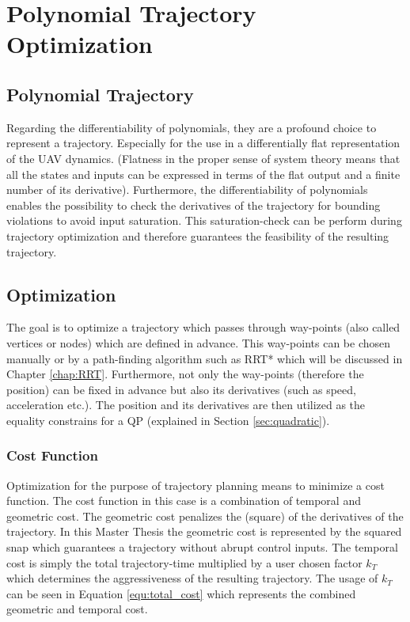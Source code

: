 \chapter{Polynomial Trajectory Optimization}\label{sec:trajectory}


\section{Polynomial Trajectory}\label{sec:polynomial}

Regarding the differentiability of polynomials, they are a profound choice to represent a trajectory. Especially for the use in a differentially flat representation of the UAV dynamics. (Flatness in the proper sense of system theory means that all the states and inputs can be expressed in terms of the flat output and a finite number of its derivative).
Furthermore, the differentiability of polynomials enables the possibility to check the derivatives of the trajectory for bounding violations to avoid input saturation. This saturation-check can be perform during trajectory optimization and therefore guarantees the feasibility of the resulting trajectory.

\section{Optimization}\label{sec:optimization}

The goal is to optimize a trajectory which passes through way-points (also called vertices or nodes) which are defined in advance. This way-points can be chosen manually or by a path-finding algorithm such as RRT* which will be discussed in Chapter \ref{chap:RRT}.
Furthermore, not only the way-points (therefore the position) can be fixed in advance but also its derivatives (such as speed, acceleration etc.). The position and its derivatives are then utilized as the equality constrains for a QP (explained in Section \ref{sec:quadratic}).

\subsection{Cost Function}\label{sec:cost}

Optimization for the purpose of trajectory planning means to minimize a cost function. The cost function in this case is a combination of temporal and geometric cost. The geometric cost penalizes the (square) of the derivatives of the trajectory. In this Master Thesis the geometric cost is represented by the squared snap which guarantees a trajectory without abrupt  control inputs. \newline
The temporal cost is simply the total trajectory-time multiplied by a user chosen factor $k_T$ which determines the aggressiveness of the resulting trajectory. The usage of  $k_T$  can be seen in Equation \ref{equ:total_cost} which represents the combined geometric and temporal cost. \newline

